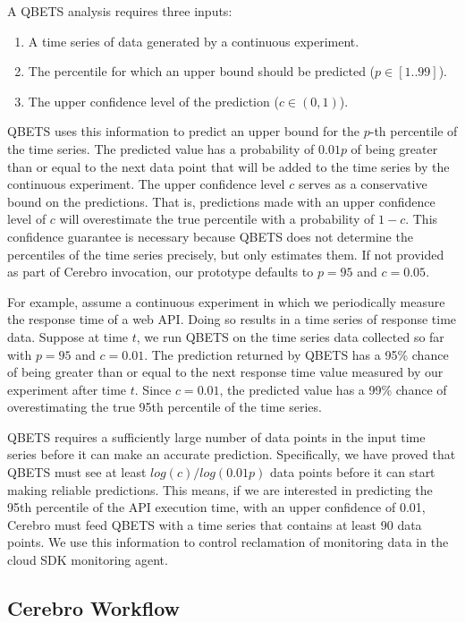 A QBETS analysis requires three inputs:
\begin{enumerate}
\item A time series of data generated by a continuous experiment.
\item The percentile for which an upper bound should be predicted ($p \in [1..99]$).
\item The upper confidence level of the prediction ($c \in (0,1)$).
\end{enumerate}

QBETS uses this information to predict an upper bound for 
the $p$-th percentile of the time series.
The predicted value has a probability of $0.01p$ of 
being greater than or equal to the next data point that
will be added to the time series by the continuous experiment. 
The upper confidence level $c$ serves as a conservative
bound on the predictions. That is, predictions made with an upper confidence 
level of $c$ will overestimate
the true percentile with a probability of $1-c$. This confidence guarantee 
is necessary because QBETS does not determine the 
percentiles of the time series precisely, but only estimates them. 
If not provided as part of Cerebro invocation, our prototype 
defaults to $p=95$ and $c=0.05$. 

For example, assume a continuous experiment 
in which we periodically measure the
response time of a web API. Doing so results in a time series of 
response time data. Suppose at time $t$,
we run QBETS on the time series data collected so far 
with $p=95$ and $c=0.01$. The prediction returned
by QBETS has a 95\% chance of being greater than or equal 
to the next response time value measured
by our experiment after time $t$. Since $c=0.01$, the predicted value has a 99\% chance of
overestimating the true 95th percentile of the time series.

QBETS requires a sufficiently large number of data points
in the input time series before it can make an accurate prediction. 
Specifically, we have proved that QBETS must see 
at least $log(c)/log(0.01p)$ data points
before it can start making reliable predictions. 
This means, if we are interested in predicting the 95th percentile
of the API execution time, with an upper confidence of 0.01, 
Cerebro must feed QBETS with a time series that
contains at least 90 data points. We use this information to control 
reclamation of monitoring data in the cloud SDK monitoring agent.

\subsection{Cerebro Workflow}

